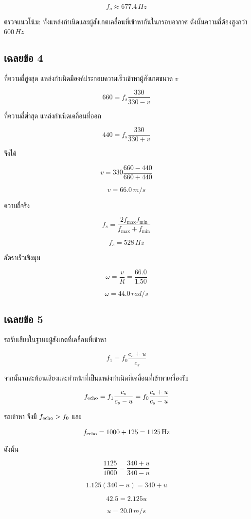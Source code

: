\[
\boxed{f_o\approx677.4\,\si{Hz}}
\]

ตรวจแนวโน้ม: ทั้งแหล่งกำเนิดและผู้สังเกตเคลื่อนที่เข้าหากันในกรอบอากาศ ดังนั้นความถี่ต้องสูงกว่า $600\,\si{Hz}$

\subsection*{เฉลยข้อ 4}

ที่ความถี่สูงสุด แหล่งกำเนิดมีองค์ประกอบความเร็วเข้าหาผู้สังเกตขนาด $v$

\[
660=f_s\frac{330}{330-v}
\tag{1}
\]

ที่ความถี่ต่ำสุด แหล่งกำเนิดเคลื่อนที่ออก

\[
440=f_s\frac{330}{330+v}
\tag{2}
\]

จึงได้

\[
v=330\frac{660-440}{660+440}
\]

\[
\boxed{v=66.0\,\si{m/s}}
\]

ความถี่จริง

\[
f_s=\frac{2f_{\max}f_{\min}}{f_{\max}+f_{\min}}
\]

\[
\boxed{f_s=528\,\si{Hz}}
\]

อัตราเร็วเชิงมุม

\[
\omega=\frac{v}{R}
=\frac{66.0}{1.50}
\]

\[
\boxed{\omega=44.0\,\si{rad/s}}
\]

\subsection*{เฉลยข้อ 5}

รถรับเสียงในฐานะผู้สังเกตที่เคลื่อนที่เข้าหา

\[
f_1=f_0\frac{c_s+u}{c_s}
\]

จากนั้นรถสะท้อนเสียงและทำหน้าที่เป็นแหล่งกำเนิดที่เคลื่อนที่เข้าหาเครื่องรับ

\[
f_{\rm echo}=f_1\frac{c_s}{c_s-u}
=f_0\frac{c_s+u}{c_s-u}
\]

รถเข้าหา จึงมี $f_{\rm echo}>f_0$ และ

\[
f_{\rm echo}=1000+125=1125\,\si{Hz}
\]

ดังนั้น

\[
\frac{1125}{1000}=\frac{340+u}{340-u}
\]

\[
1.125(340-u)=340+u
\]

\[
42.5=2.125u
\]

\[
\boxed{u=20.0\,\si{m/s}}
\]

